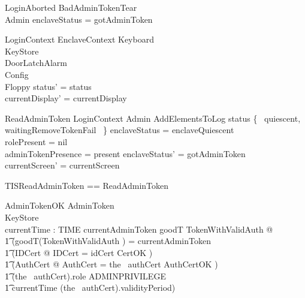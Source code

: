 \begin{schema}{LoginAborted}
        BadAdminTokenTear
\\      \Xi Admin
\where
        enclaveStatus = gotAdminToken
\end{schema}

\begin{schema}{LoginContext}
        EnclaveContext
\also
        \Xi Keyboard
\\      \Xi KeyStore
\\      \Xi DoorLatchAlarm
\\      \Xi Config
\\      \Xi Floppy
\where
        status' = status
\\      currentDisplay' = currentDisplay
\end{schema}

\begin{schema}{ReadAdminToken}
         LoginContext
\also
        \Xi Admin
\also
        AddElementsToLog
\where
        status \in \{~ quiescent, waitingRemoveTokenFail ~\}
\also
        enclaveStatus = enclaveQuiescent
\\      rolePresent = nil
\\	adminTokenPresence = present
\also
	enclaveStatus' = gotAdminToken
\\      currentScreen' = currentScreen
\end{schema}

\begin{zed}
        TISReadAdminToken == 
                ReadAdminToken   
\end{zed}

\begin{schema}{AdminTokenOK}
        AdminToken
\\      KeyStore
\\      currentTime : TIME        
\where
        currentAdminToken \in \ran goodT
\also
        \exists TokenWithValidAuth @
\\ \t1  (goodT(\theta TokenWithValidAuth )  = currentAdminToken
\\ \t1  \land (\exists IDCert @ \theta IDCert = idCert \land CertOK )
\\ \t1  \land (\exists AuthCert @ \theta AuthCert = the~ authCert \land
AuthCertOK )
\\ \t1  \land (the~ authCert).role \in ADMINPRIVILEGE 
\\ \t1  \land currentTime \in (the~ authCert).validityPeriod)
\end{schema}

